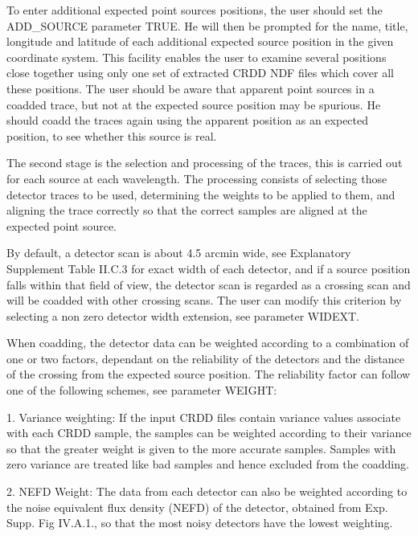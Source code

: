 \begin{small}
{{      To enter additional expected point sources positions, the user should
      set the ADD\_SOURCE parameter TRUE. He will then be prompted for the
      name, title, longitude and latitude of each additional expected source
      position in the given coordinate system. This facility enables the user
      to examine several positions close together using only one set of
      extracted CRDD NDF files which cover all these positions. The user
      should be aware that apparent point sources in a coadded trace, but not
      at the expected source position may be spurious. He should coadd
      the traces again using the apparent position as an expected position,
      to see whether this source is real.

      The second stage is the selection and processing of the traces, this
      is carried out for each source at each wavelength. The processing
      consists of selecting those detector traces to be used, determining
      the weights to be applied to them, and aligning the trace correctly
      so that the correct samples are aligned at the expected point source.

      By default, a detector scan is about 4.5 arcmin wide, see Explanatory
      Supplement Table II.C.3 for exact width of each detector, and if a
      source position falls within that field of view, the detector
      scan is regarded as a crossing scan and will be coadded with other
      crossing scans. The user can modify this criterion by selecting a
      non zero detector width extension, see parameter WIDEXT.

      When coadding, the detector data can be weighted according to a
      combination of one or two factors, dependant on the reliability of
      the detectors and the distance of the crossing from the expected
      source position. The reliability factor can follow one of the
      following schemes, see parameter WEIGHT:

      1. Variance weighting: If the input CRDD files contain variance
         values associate with each CRDD sample, the samples can be
         weighted according to their variance so that the greater weight
         is given to the more accurate samples. Samples with zero
         variance are treated like bad samples and hence excluded from
         the coadding.

      2. NEFD Weight: The data from each detector can also be weighted
         according to the noise equivalent flux density (NEFD) of the
         detector, obtained from Exp. Supp. Fig IV.A.1., so that the
         most noisy detectors have the lowest weighting.

}}
\end{small}
